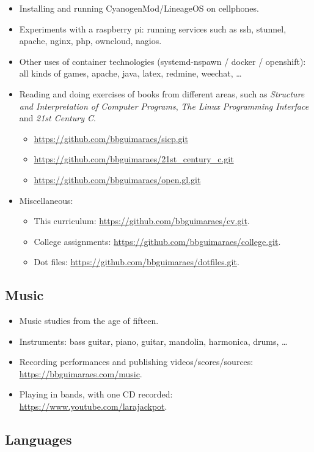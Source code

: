 \begin{itemize}[noitemsep]
    \item Installing and running CyanogenMod/LineageOS on cellphones.
    \item
        Experiments with a raspberry pi: running services such as ssh, stunnel,
        apache, nginx, php, owncloud, nagios.
    \item
        Other uses of container technologies (systemd-nspawn / docker /
        openshift): all kinds of games, apache, java, latex, redmine, weechat,
        …
    \item
        Reading and doing exercises of books from different areas, such as
        \textit{Structure and Interpretation of Computer Programs}, \textit{The
        Linux Programming Interface} and \textit{21st Century C}.
        \begin{itemize}[noitemsep]
            \item \url{https://github.com/bbguimaraes/sicp.git}
            \item \url{https://github.com/bbguimaraes/21st_century_c.git}
            \item \url{https://github.com/bbguimaraes/open.gl.git}
        \end{itemize}
    \item Miscellaneous:
        \begin{itemize}[noitemsep]
            \item
                This curriculum:
                \url{https://github.com/bbguimaraes/cv.git}.
            \item
                College assignments:
                \url{https://github.com/bbguimaraes/college.git}.
            \item
                Dot files:
                \url{https://github.com/bbguimaraes/dotfiles.git}.
        \end{itemize}
\end{itemize}

\subsection*{Music}

\begin{itemize}[noitemsep]
    \item Music studies from the age of fifteen.
    \item
        Instruments: bass guitar, piano, guitar, mandolin, harmonica, drums, …
    \item
        Recording performances and publishing videos/scores/sources:
        \url{https://bbguimaraes.com/music}.
    \item
        Playing in bands, with one CD recorded:
        \url{https://www.youtube.com/larajackpot}.
\end{itemize}

\subsection*{Languages}
